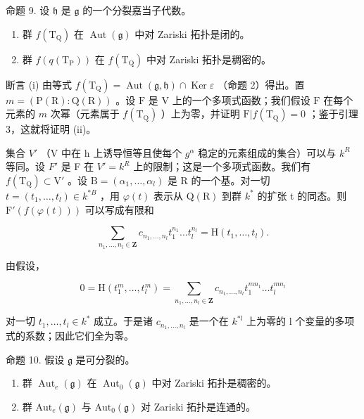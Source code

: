 命题 9. 设 \(\mathfrak{h}\) 是 \(\mathfrak{g}\) 的一个分裂嘉当子代数。

\begin{enumerate}
\def\labelenumi{(\roman{enumi})}
\item
  群 \(f(\mathrm{T}_{\mathrm{Q}})\) 在 \(\operatorname{Aut}(\mathfrak{g})\) 中对 Zariski 拓扑是闭的。
\item
  群 \(f(q(\mathrm{T_P}))\) 在 \(f(\mathrm{T_Q})\) 中对 Zariski 拓扑是稠密的。
\end{enumerate}

断言 (i) 由等式 \(f(\mathrm{T}_{\mathrm{Q}}) = \operatorname{Aut}(\mathfrak{g},\mathfrak{h})\cap \operatorname{Ker}\varepsilon\) （命题 2）得出。置 \(m = (\mathrm{P}(\mathrm{R}):\mathrm{Q}(\mathrm{R}))\) 。设 \(\mathrm{F}\) 是 \(\mathrm{V}\) 上的一个多项式函数；我们假设 \(\mathrm{F}\) 在每个元素的 \(m\) 次幂（元素属于 \(f(\mathrm{T}_{\mathrm{Q}})\) ）上为零，并证明 \(\mathrm{F}|f(\mathrm{T}_{\mathrm{Q}}) = 0\) ；鉴于引理 3，这就将证明 (ii)。

集合 \(V'\) （V 中在 h 上诱导恒等且使每个 \(g^{\alpha}\) 稳定的元素组成的集合）可以与 \(k^{R}\) 等同。设 \(F'\) 是 F 在 \(V' = k^{R}\) 上的限制；这是一个多项式函数。我们有 \(f(\mathrm{T}_{\mathrm{Q}}) \subset \mathrm{V}'\) 。设 \(\mathrm{B} = (\alpha_{1}, \ldots, \alpha_{l})\) 是 R 的一个基。对一切 \(t = (t_{1}, \ldots, t_{l}) \in k^{*B}\) ，用 \(\varphi(t)\) 表示从 \(\mathrm{Q}(\mathrm{R})\) 到群 \(k^{*}\) 的扩张 t 的同态。则 \(\mathrm{F}'(f(\varphi(t)))\) 可以写成有限和

\[
\sum_ {n _ {1}, \dots , n _ {l} \in \mathbf {Z}} c _ {n _ {1}, \dots , n _ {l}} t _ {1} ^ {n _ {1}} \dots t _ {l} ^ {n _ {l}} = \mathrm{H} (t _ {1}, \dots , t _ {l}).
\]

由假设，

\[
0 = \mathrm{H} (t _ {1} ^ {m}, \dots , t _ {l} ^ {m}) = \sum_ {n _ {1}, \dots , n _ {l} \in \mathbf {Z}} c _ {n _ {1}, \dots , n _ {l}} t _ {1} ^ {m n _ {1}} \dots t _ {l} ^ {m n _ {l}}
\]

对一切 \(t_{1},\ldots,t_{l}\in k^{*}\) 成立。于是诸 \(c_{n_{1},\ldots,n_{l}}\) 是一个在 \(k^{*l}\) 上为零的 l 个变量的多项式的系数；因此它们全为零。

命题 10. 假设 \(\mathfrak{g}\) 是可分裂的。

\begin{enumerate}
\def\labelenumi{(\roman{enumi})}
\item
  群 \(\operatorname{Aut}_{e}(\mathfrak{g})\) 在 \(\operatorname{Aut}_{0}(\mathfrak{g})\) 中对 Zariski 拓扑是稠密的。
\item
  群 \(\mathrm{Aut}_e(\mathfrak{g})\) 与 \(\mathrm{Aut}_0(\mathfrak{g})\) 对 Zariski 拓扑是连通的。
\end{enumerate}

